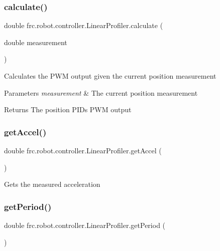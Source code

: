 \subsubsection{\texorpdfstring{calculate()}{calculate()}}
{\footnotesize\ttfamily double frc.\+robot.\+controller.\+Linear\+Profiler.\+calculate (\begin{DoxyParamCaption}\item[{double}]{measurement }\end{DoxyParamCaption})\hspace{0.3cm}{\ttfamily [inline]}}

Calculates the P\+WM output given the current position measurement


\begin{DoxyParams}{Parameters}
{\em measurement} & The current position measurement \\
\hline
\end{DoxyParams}
\begin{DoxyReturn}{Returns}
The position P\+ID\textquotesingle{}s P\+WM output 
\end{DoxyReturn}
\mbox{\label{classfrc_1_1robot_1_1controller_1_1_linear_profiler_a0bfafea6b9a9c4eb9d30f2c1214d86db}} 
\subsubsection{\texorpdfstring{getAccel()}{getAccel()}}
{\footnotesize\ttfamily double frc.\+robot.\+controller.\+Linear\+Profiler.\+get\+Accel (\begin{DoxyParamCaption}{ }\end{DoxyParamCaption})\hspace{0.3cm}{\ttfamily [inline]}}

Gets the measured acceleration \mbox{\label{classfrc_1_1robot_1_1controller_1_1_linear_profiler_ab713bb7047183a7ef960afc396bcc6ce}} 
\subsubsection{\texorpdfstring{getPeriod()}{getPeriod()}}
{\footnotesize\ttfamily double frc.\+robot.\+controller.\+Linear\+Profiler.\+get\+Period (\begin{DoxyParamCaption}{ }\end{DoxyParamCaption})\hspace{0.3cm}{\ttfamily [inline]}}

